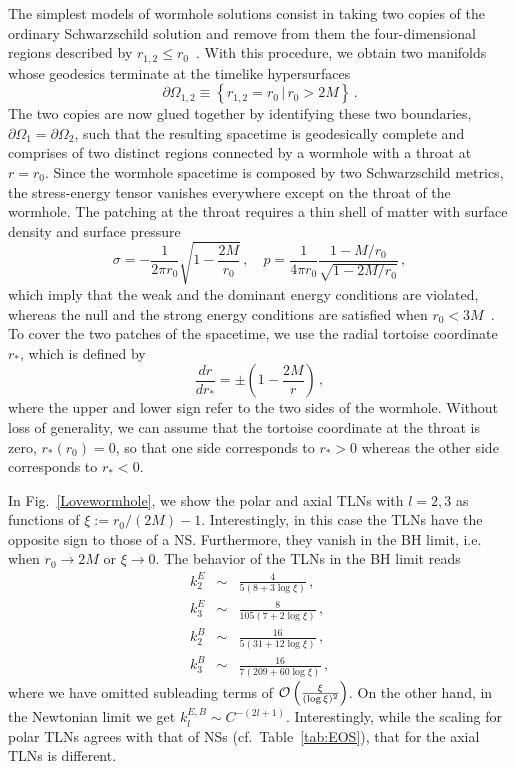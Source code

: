 \documentclass[aps,twocolumn,showpacs,preprintnumbers,nofootinbib,prd,superscriptaddress,groupedaddress,10pt]{revtex4-1}
\newcommand{\beq}{\begin{eqnarray}}
\newcommand{\eeq}{\end{eqnarray}}
\begin{document}
The simplest models of wormhole solutions consist in taking two copies of the ordinary Schwarzschild solution and remove from them the four-dimensional regions described by $r_{1,2}\leq r_0$~\cite{visser1995lorentzian}.
With this procedure, we obtain two manifolds whose geodesics terminate at the timelike hypersurfaces
%
\begin{equation}
\partial\Omega_{1,2}\equiv\left\lbrace r_{1,2}= r_0\, |\, r_0>2M\right\rbrace\,.
\end{equation}
%
The two copies are now glued together by identifying these two boundaries, $\partial\Omega_1=\partial\Omega_2$, such that the resulting spacetime is geodesically complete and comprises of two distinct regions connected by a wormhole with a throat at $r=r_0$. Since the wormhole spacetime is composed by two Schwarzschild metrics, the stress-energy tensor vanishes everywhere except on the throat of the wormhole. The patching at the throat requires a thin shell of matter with surface density and surface pressure
%
\begin{equation}
\sigma=-\frac{1}{2\pi r_0} \sqrt{1-\frac{2M}{r_0}}\,,\quad p=\frac{1}{4\pi r_0}\frac{1-M/r_0}{\sqrt{1-2M/r_0}}\,,
\end{equation}
%
which imply that the weak and the dominant energy conditions are violated, whereas the null and the strong energy conditions are satisfied when $r_0<3M$~\cite{Cardoso:2016oxy}.
%
To cover the two patches of the spacetime, we use the radial tortoise coordinate $r_*$, which is defined by
%
\begin{equation}
\label{tortoise}
\frac{dr}{dr_*}=\pm\left(1-\frac{2M}{r}\right)\,,
\end{equation} 
%
where the upper and lower sign refer to the two sides of the wormhole. Without loss of generality, we can assume that the tortoise coordinate at the throat is zero, \mbox{$r_*(r_0)=0$}, so that one side corresponds to $r_*>0$ whereas the other side corresponds to $r_*<0$.


In Fig.~\ref{Lovewormhole}, we show the polar and axial TLNs with \mbox{$l=2,3$} as functions of $\xi:=r_0/(2M)-1$. Interestingly, in this case the TLNs have the opposite sign to those of a NS. Furthermore, they vanish in the BH limit, i.e. when $r_0\to 2M$ or $\xi\to0$. The behavior of the TLNs in the BH limit reads
%
\beq
k^E_2&\sim& \frac{4}{5(8+3\log\xi)}\,,\\
%
k^E_3&\sim& \frac{8}{105(7+2\log\xi)}\,,\\
k^B_{2}&\sim&\frac{16}{5(31+12\log\xi)}\,,\\
%
k^B_{3}&\sim&\frac{16}{7(209+60\log\xi)}\,,
\eeq
%
where we have omitted subleading terms of ${\cal O}\left(\frac{\xi}{(\log\xi)^2}\right)$. On the other hand, in the Newtonian limit we get $k^{E,B}_l\sim C^{-(2l+1)}$. Interestingly, while the scaling for polar TLNs agrees with that of NSs (cf.\ Table~\ref{tab:EOS}), that for the axial TLNs is different.
\end{document}
